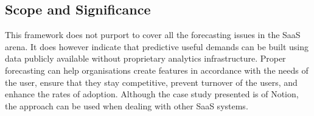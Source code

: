 \subsection{Scope and Significance}
This framework does not purport to cover all the forecasting issues in the SaaS arena. It does however indicate that predictive useful demands can be built using data publicly available without proprietary analytics infrastructure. Proper forecasting can help organisations create features in accordance with the needs of the user, ensure that they stay competitive, prevent turnover of the users, and enhance the rates of adoption. Although the case study presented is of Notion, the approach can be used when dealing with other SaaS systems.
